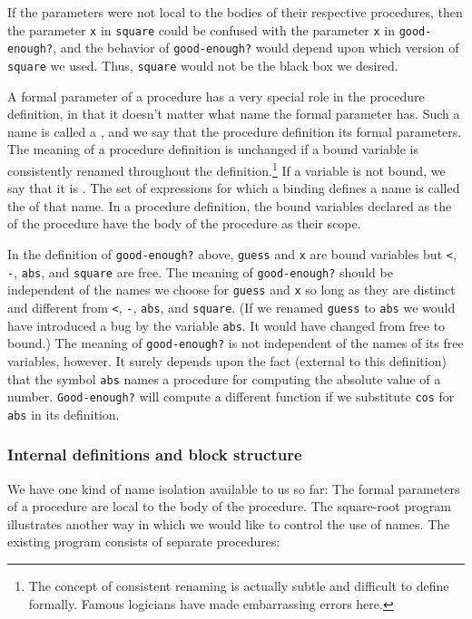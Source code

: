 \begin{schemedisplay}
If the parameters were not local to the bodies of their respective
procedures, then the parameter \texttt{x} in \texttt{square} could be
confused with the parameter \texttt{x} in \texttt{good-enough?}, and the
behavior of \texttt{good-enough?} would depend upon which version of
\texttt{square} we used.  Thus, \texttt{square} would not be the black box
we desired.

A formal parameter of a procedure has a very special role in the
procedure definition, in that it doesn't matter what name the formal
parameter has.  Such a name is called a , and we
say that the procedure definition  its formal parameters.
The meaning of a procedure definition is unchanged if a bound variable
is consistently renamed throughout the definition.\footnote{The
concept of consistent renaming is actually subtle and difficult to
define formally.  Famous logicians have made embarrassing errors
here.}  If a variable is not bound, we say that it is .  The
set of expressions for which a binding defines a name is called the
 of that name.
In a procedure definition, the bound variables
declared as the  of the procedure have the body of
the procedure as their scope.

In the definition of \texttt{good-enough?} above, \texttt{guess} and \texttt{x} are
bound variables but \texttt{<}, \texttt{-}, \texttt{abs}, and \texttt{square} are free.
The meaning of \texttt{good-enough?} should be independent of the names we
choose for \texttt{guess} and \texttt{x} so long as they are distinct and
different from \texttt{<}, \texttt{-}, \texttt{abs}, and \texttt{square}.  (If we renamed
\texttt{guess} to \texttt{abs} we would have introduced a bug by 
the variable \texttt{abs}.  It would have changed from free to bound.)  The
meaning of \texttt{good-enough?} is not independent of the names of its
free variables, however.  It surely depends upon the fact (external to
this definition) that the symbol \texttt{abs} names a procedure for
computing the absolute value of a number.  \texttt{Good-enough?} will
compute a different function if we substitute \texttt{cos} for \texttt{abs} in
its definition.

\subsubsection*{Internal definitions and block structure}


We have one kind of name isolation available to us so far: The formal
parameters of a procedure are local to the body of the procedure.  The
square-root program illustrates another way in which we would like to
control the use of names.  The existing program consists of separate
procedures:


\end{schemedisplay}
